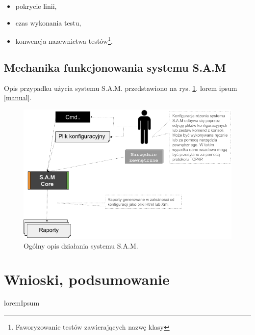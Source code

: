 \documentclass[11pt,a4paper,oldfontcommands]{memoir}
\theoremstyle{plain}
\theoremstyle{definition}
\theoremstyle{remark}
\begin{document}
\begin{itemize}
\item pokrycie linii,
\item czas wykonania testu,
\item konwencja nazewnictwa testów\footnote{Faworyzowanie testów zawierających nazwę klasy}.
\end{itemize}


\section{Mechanika funkcjonowania systemu S.A.M}

Opis przypadku użycia systemu S.A.M. przedstawiono na rys. \ref{fig:SamUsecase}.
lorem ipsum  \ref{manual}.

\begin{figure}[H]
  \centering
  \includegraphics[width=1\textwidth]{OpisSystemu_IMG/UseCase.png}
    \caption{Ogólny opis działania systemu S.A.M.}
   \label{fig:SamUsecase}
 
\end{figure}












\chapter{Wnioski, podsumowanie  \label{Summary:chapter}}

loremIpsum




\end{document}
